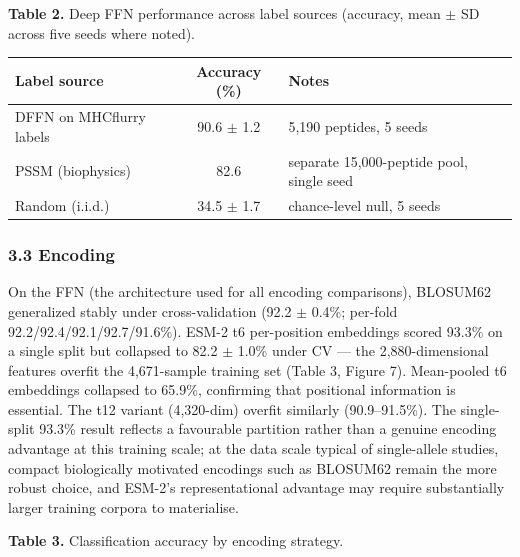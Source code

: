 \documentclass[10pt]{article}
\newcounter{none} %
\begin{document}
\textbf{Table 2.} Deep FFN performance across label sources (accuracy,
mean $\pm$ SD across five seeds where noted).

{\def\LTcaptype{none} %
\begin{longtable}[]{@{}lcl@{}}
\toprule\noalign{}
Label source & Accuracy (\%) & Notes \\
\midrule\noalign{}
\endhead
\bottomrule\noalign{}
\endlastfoot
DFFN on MHCflurry labels & 90.6 $\pm$ 1.2 & 5,190 peptides, 5 seeds \\
PSSM (biophysics) & 82.6 & separate 15,000-peptide pool, single seed \\
Random (i.i.d.) & 34.5 $\pm$ 1.7 & chance-level null, 5 seeds \\
\end{longtable}
}

\subsubsection{3.3 Encoding}\label{encoding}

On the FFN (the architecture used for all encoding comparisons),
BLOSUM62 generalized stably under cross-validation (92.2 $\pm$ 0.4\%;
per-fold 92.2/92.4/92.1/92.7/91.6\%). ESM-2 t6 per-position embeddings
scored 93.3\% on a single split but collapsed to 82.2 $\pm$ 1.0\% under CV
--- the 2,880-dimensional features overfit the 4,671-sample training set
(Table 3, Figure 7). Mean-pooled t6 embeddings collapsed to 65.9\%,
confirming that positional information is essential. The t12 variant
(4,320-dim) overfit similarly (90.9--91.5\%). The single-split 93.3\%
result reflects a favourable partition rather than a genuine encoding
advantage at this training scale; at the data scale typical of
single-allele studies, compact biologically motivated encodings such as
BLOSUM62 remain the more robust choice, and ESM-2's representational
advantage may require substantially larger training corpora to
materialise.

\textbf{Table 3.} Classification accuracy by encoding strategy.
\end{document}
